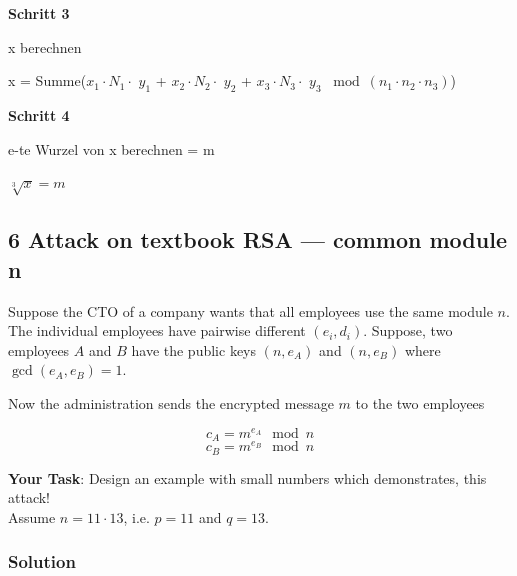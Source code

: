 \documentclass[11pt]{article}
\begin{document}
\textbf{Schritt 3}

x berechnen

x = Summe(\(x_1 \cdot N_1 \cdot\) \(y_1\) + \(x_2 \cdot N_2 \cdot\)
\(y_2\) + \(x_3 \cdot N_3 \cdot\) \(y_3\)
\(\bmod (n_1 \cdot n_2 \cdot n_3 )\))

\textbf{Schritt 4}

e-te Wurzel von x berechnen = m

\(\sqrt[3]{x} = m\)

\newpage

    \hypertarget{attack-on-textbook-rsa-common-module-n}{%
\subsection{6 Attack on textbook RSA --- common module
n}\label{attack-on-textbook-rsa-common-module-n}}

Suppose the CTO of a company wants that all employees use the same
module \(n\). The individual employees have pairwise different
\((e_i , d_i )\). Suppose, two employees \(A\) and \(B\) have the public
keys \((n,e_A)\) and \((n,e_B)\) where \(\gcd(e_A,e_B) = 1\).

Now the administration sends the encrypted message \(m\) to the two
employees

\[c_A = m^{e_A} \mod n \] \[ c_B = m^{e_B} \mod n\]

\textbf{Your Task}: Design an example with small numbers which
demonstrates, this attack!\\
Assume \(n = 11\cdot 13\), i.e. \(p = 11\) and \(q = 13\).

\hypertarget{solution}{%
\subsubsection{Solution}\label{solution}}
\end{document}

